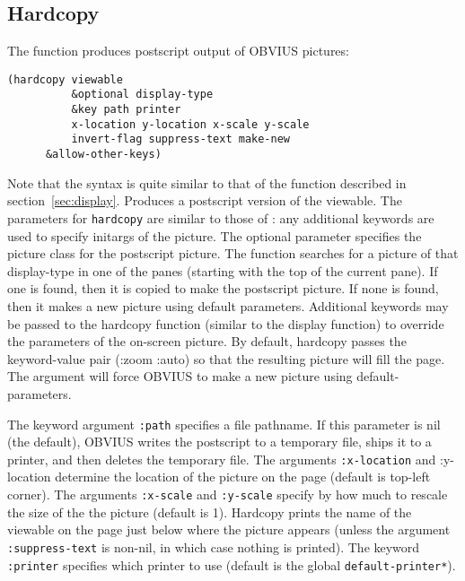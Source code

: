 
\subsection{Hardcopy}
\label{sec:hardcopy}

The function  produces postscript output of OBVIUS
pictures:
\begin{verbatim}
(hardcopy viewable
          &optional display-type
          &key path printer
          x-location y-location x-scale y-scale
          invert-flag suppress-text make-new
	  &allow-other-keys)
\end{verbatim}
\noindent
Note that the syntax is quite similar to that of  the 
function described in section~\ref{sec:display}.
Produces a postscript version of the viewable.  The parameters for
{\tt hardcopy} are similar to those of : any additional
keywords are used to specify initargs of the picture.  The optional
parameter
 specifies the picture class for the postscript
picture.  The function searches for a picture of that display-type in
one of the panes (starting with the top of the current pane).  If one
is found, then it is copied to make the postscript picture.  If none
is found, then it makes a new picture using default parameters.
Additional keywords may be passed to the hardcopy function (similar to
the display function) to override the parameters of the on-screen
picture.  By default, hardcopy passes the keyword-value pair (:zoom
:auto) so that the resulting picture will fill the page. The argument
 will force OBVIUS to make a new picture using
default-parameters.

The keyword argument {\tt :path} specifies a file pathname.  If this
parameter is nil (the default), OBVIUS writes the postscript to a
temporary file, ships it to a printer, and then deletes the temporary
file.  The arguments {\tt :x-location} and :y-location determine the
location of the picture on the page (default is top-left corner).  The
arguments {\tt :x-scale} and {\tt :y-scale} specify by how much to
rescale the size of the the picture (default is 1).  Hardcopy prints
the name of the viewable on the page just below where the picture
appears (unless the argument {\tt :suppress-text} is non-nil, in
which case nothing is printed).  The keyword {\tt :printer} specifies
which printer to use (default is the global {\tt *default-printer*}).

